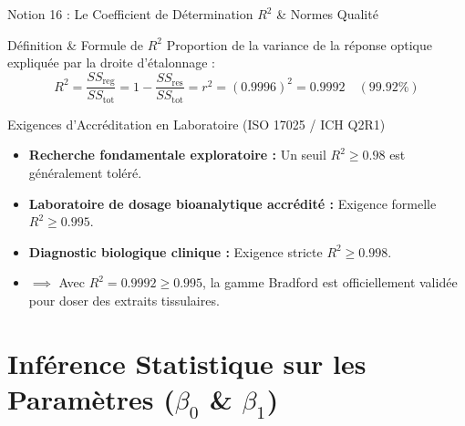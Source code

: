 \documentclass[aspectratio=169,10pt]{beamer}
\begin{document}
\begin{frame}{Notion 16 : Le Coefficient de Détermination $R^2$ \& Normes Qualité}
  \begin{conceptbox}{Définition \& Formule de $R^2$}
    \footnotesize
    Proportion de la variance de la réponse optique expliquée par la droite d'étalonnage :
    \begin{equation*}
      R^2 = \frac{SS_{\text{reg}}}{SS_{\text{tot}}} = 1 - \frac{SS_{\text{res}}}{SS_{\text{tot}}} = r^2 = (0.9996)^2 = \mathbf{0.9992} \quad (\mathbf{99.92\%})
    \end{equation*}
  \end{conceptbox}
  \vspace{1mm}
  \begin{biobox}{Exigences d'Accréditation en Laboratoire (ISO 17025 / ICH Q2R1)}
    \footnotesize
    \begin{itemize}
      \item \textbf{Recherche fondamentale exploratoire :} Un seuil $R^2 \ge 0.98$ est généralement toléré.
      \item \textbf{Laboratoire de dosage bioanalytique accrédité :} Exigence formelle $R^2 \ge 0.995$.
      \item \textbf{Diagnostic biologique clinique :} Exigence stricte $R^2 \ge 0.998$.
      \item $\implies$ Avec $R^2 = 0.9992 \ge 0.995$, la gamme Bradford est officiellement validée pour doser des extraits tissulaires.
    \end{itemize}
  \end{biobox}
\end{frame}

\section{Inférence Statistique sur les Paramètres (\texorpdfstring{$\beta_0$ \& $\beta_1$}{beta0 et beta1})}
\end{document}
